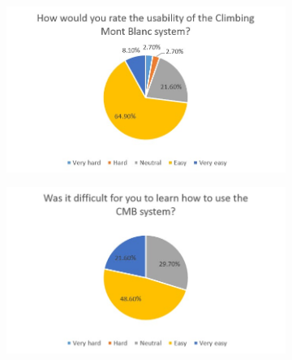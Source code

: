 \begin{figure}
\begin{subfigure}[h]{0.4\textwidth}
        \caption{}
        \label{fig:cmb-general}
    \end{subfigure}
    ~ %
    \hspace*{-1.5cm}
    \begin{subfigure}[h]{0.4\textwidth}
        \includegraphics[width=1.5\textwidth, height=1.0\textwidth]{oldresults/cmb_usability.jpg}
        \caption{}
        \label{fig:cmb-usability}
    \end{subfigure}
    \hfill
    \begin{subfigure}[h]{0.4\textwidth}
        \includegraphics[width=1.5\textwidth, height=1.0\textwidth]{oldresults/cmb_learn.jpg}

\end{subfigure}
\end{figure}

